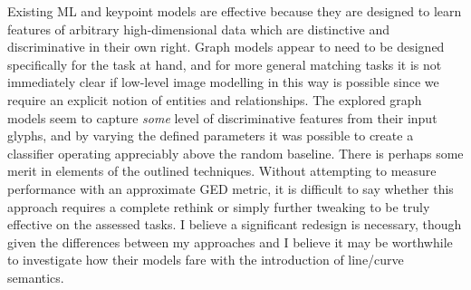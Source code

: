 \documentclass{mpaper}
\begin{document}
Existing ML and keypoint models are effective because they are designed to learn features of arbitrary high-dimensional data which are distinctive and discriminative in their own right.
Graph models appear to need to be designed specifically for the task at hand, and for more general matching tasks it is not immediately clear if low-level image modelling in this way is possible since we require an explicit notion of entities and relationships.
The explored graph models seem to capture \emph{some} level of discriminative features from their input glyphs, and by varying the defined parameters it was possible to create a classifier operating appreciably above the random baseline.
There is perhaps some merit in elements of the outlined techniques.
Without attempting to measure performance with an approximate GED metric, it is difficult to say whether this approach requires a complete rethink or simply further tweaking to be truly effective on the assessed tasks.
I believe a significant redesign is necessary, though given the differences between my approaches and \citeauthor{Graphs-Handwriting} \cite{Graphs-Handwriting} I believe it may be worthwhile to investigate how their models fare with the introduction of line/curve semantics.
\end{document}
